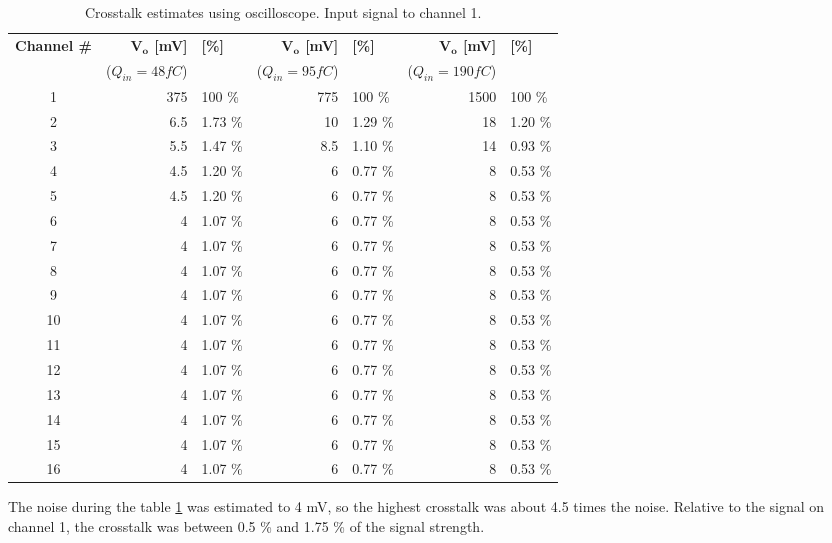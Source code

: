 \documentclass[../main/thesis.tex]{subfiles}
\begin{document}
\begin{table}[h!]
	\begin{center}
		\caption{Crosstalk estimates using oscilloscope. Input signal to channel 1.}
		\label{tab-crosstalk-osc}
		\begin{tabular}{crlrlrl} \toprule
			\textbf{Channel \#} & \textbf{$\mathbf{V_o}$ [mV]} &\textbf{[\%]}& \textbf{$\mathbf{V_o}$ [mV]} & \textbf{[\%]}& \textbf{$\mathbf{V_o}$ [mV]} &\textbf{[\%]}\\
			     & ($Q_{in}=48 fC$) && ($Q_{in}=95 fC$) && ($Q_{in}=190 fC$)& \\ \midrule
			1  & 375  & 100 \% & 775 & 100 \% & 1500 & 100 \% \\
			2  & 6.5 & 1.73 \%   & 10  & 1.29 \%   & 18   & 1.20 \%   \\
			3  & 5.5 & 1.47 \%   & 8.5 & 1.10 \%   & 14   & 0.93 \%   \\
			4  & 4.5 & 1.20 \%   & 6   & 0.77 \%   & 8    & 0.53 \%   \\
			5  & 4.5 & 1.20 \%   & 6   & 0.77 \%   & 8    & 0.53 \%   \\
			6  & 4 & 1.07 \%   & 6   & 0.77 \%   & 8    & 0.53 \%   \\
			7  & 4 & 1.07 \%   & 6   & 0.77 \%   & 8    & 0.53 \%   \\
			8  & 4 & 1.07 \%   & 6   & 0.77 \%   & 8    & 0.53 \%   \\
			9  & 4 & 1.07 \%   & 6   & 0.77 \%   & 8    & 0.53 \%   \\
			10 & 4 & 1.07 \%   & 6   & 0.77 \%   & 8    & 0.53 \%   \\
			11 & 4 & 1.07 \%   & 6   & 0.77 \%   & 8    & 0.53 \%   \\
			12 & 4 & 1.07 \%   & 6   & 0.77 \%   & 8    & 0.53 \%   \\
			13 & 4 & 1.07 \%   & 6   & 0.77 \%   & 8    & 0.53 \%   \\
			14 & 4 & 1.07 \%   & 6   & 0.77 \%   & 8    & 0.53 \%   \\
			15 & 4 & 1.07 \%   & 6   & 0.77 \%   & 8    & 0.53 \%   \\
			16 & 4 & 1.07 \%   & 6   & 0.77 \%   & 8    & 0.53 \%      \\ \bottomrule
		\end{tabular}
	\end{center}
\end{table}

The noise during the table \ref{tab-crosstalk-osc} was estimated to 4 mV, so the highest crosstalk was about 4.5 times the noise. Relative to the signal on channel 1, the crosstalk was between 0.5 \% and 1.75 \% of the signal strength. 
\end{document}
